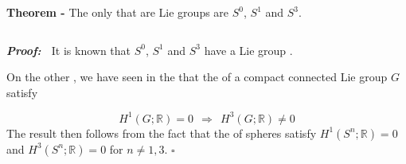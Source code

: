 \documentclass[12pt]{article}
\begin{document}

{\bf Theorem -} The only  that are Lie groups are $S^0$, $S^1$ and $S^3$.

$\,$

{\bf \emph{Proof:}} $\;$ It is known that $S^0$, $S^1$ and $S^3$ have a Lie group .

On the other , we have seen in the  that the  of a compact connected Lie group $G$ satisfy

\begin{displaymath}
H^1(G;\mathbb{R})= 0 \;\, \Longrightarrow \;\, H^3(G;\mathbb{R}) \neq 0
\end{displaymath}
The result then follows from the fact that the  of spheres satisfy $H^1(S^n;\mathbb{R})= 0$ and $H^3(S^n;\mathbb{R})= 0$ for $n \neq 1,3$. $\square$

\end{document}

